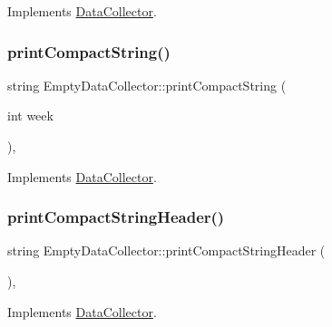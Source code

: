 Implements \mbox{\hyperlink{classDataCollector_a01486bf58acbe37b203f97b3b9a79c40_a01486bf58acbe37b203f97b3b9a79c40}{Data\+Collector}}.

\mbox{\label{classEmptyDataCollector_ad4a4ebbf610b3939e34442795a392dd5_ad4a4ebbf610b3939e34442795a392dd5}} 
\subsubsection{\texorpdfstring{print\+Compact\+String()}{printCompactString()}}
{\footnotesize\ttfamily string Empty\+Data\+Collector\+::print\+Compact\+String (\begin{DoxyParamCaption}\item[{int}]{week }\end{DoxyParamCaption})\hspace{0.3cm}{\ttfamily [override]}, {\ttfamily [virtual]}}



Implements \mbox{\hyperlink{classDataCollector_a2eac264fa5612aed5a830b12de4f4ae3_a2eac264fa5612aed5a830b12de4f4ae3}{Data\+Collector}}.

\mbox{\label{classEmptyDataCollector_a345d478e92af2ab4bcbaeeae3c7a3faa_a345d478e92af2ab4bcbaeeae3c7a3faa}} 
\subsubsection{\texorpdfstring{print\+Compact\+String\+Header()}{printCompactStringHeader()}}
{\footnotesize\ttfamily string Empty\+Data\+Collector\+::print\+Compact\+String\+Header (\begin{DoxyParamCaption}{ }\end{DoxyParamCaption})\hspace{0.3cm}{\ttfamily [override]}, {\ttfamily [virtual]}}



Implements \mbox{\hyperlink{classDataCollector_a98dcb4ec871d9c7fbf7545c64e5ccc67_a98dcb4ec871d9c7fbf7545c64e5ccc67}{Data\+Collector}}.

